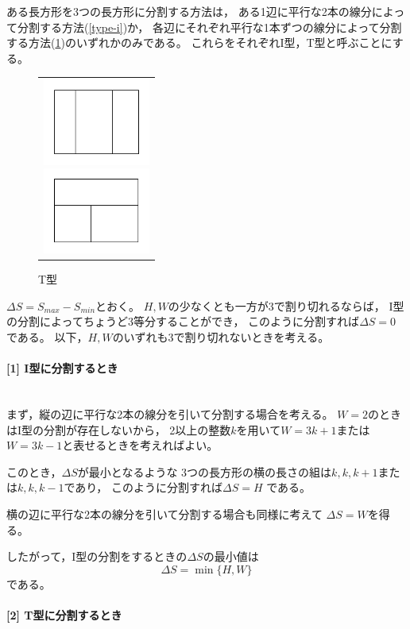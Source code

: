 \documentclass{article}
\newcommand{\myparagraph}[1]{\paragraph{#1}\mbox{}\\}
\begin{document}
ある長方形を3つの長方形に分割する方法は，
ある1辺に平行な2本の線分によって分割する方法(\cref{type-i})か，
各辺にそれぞれ平行な1本ずつの線分によって分割する方法(\cref{type-t})のいずれかのみである。
これらをそれぞれI型，T型と呼ぶことにする。

\begin{figure}[h]
    \begin{center}
        \begin{tabular}{c}
            \begin{minipage}{0.33\hsize}
                \begin{center}
                    \includegraphics[width=100pt]{type-i.png}
                    \caption{I型}
                    \label{type-i}
                \end{center}
            \end{minipage}

            \begin{minipage}{0.33\hsize}
                \begin{center}
                    \includegraphics[width=100pt]{type-t.png}
                    \caption{T型}
                    \label{type-t}
                \end{center}
            \end{minipage}
        \end{tabular}
    \end{center}
\end{figure}

$\Delta S = S_{max} - S_{min}$とおく。
$H, W$の少なくとも一方が3で割り切れるならば，
I型の分割によってちょうど3等分することができ，
このように分割すれば$\Delta S = 0$である。
以下，$H, W$のいずれも3で割り切れないときを考える。

\myparagraph{[1] I型に分割するとき}

まず，縦の辺に平行な2本の線分を引いて分割する場合を考える。
$W = 2$のときはI型の分割が存在しないから，
2以上の整数$k$を用いて$W = 3k + 1$または$W = 3k - 1$と表せるときを考えればよい。

このとき，$\Delta S$が最小となるような
3つの長方形の横の長さの組は$k, k, k + 1$または$k, k, k - 1$であり，
このように分割すれば$\Delta S = H$ である。

横の辺に平行な2本の線分を引いて分割する場合も同様に考えて
$\Delta S = W$を得る。

したがって，I型の分割をするときの$\Delta S$の最小値は
\begin{equation*}
    \Delta S = \min \{H, W\}
\end{equation*}
である。

\myparagraph{[2] T型に分割するとき}
\end{document}
